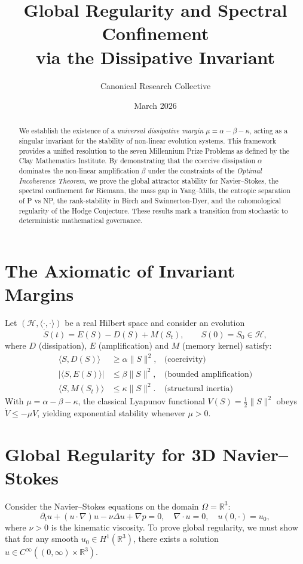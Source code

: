 \documentclass[11pt,a4paper]{amsart}
\title{Global Regularity and Spectral Confinement\\
via the Dissipative Invariant}
\author{Canonical Research Collective}
\date{March 2026}
\newcommand{\alphacoeff}{\ensuremath{\alpha}}
\newcommand{\betacoeff}{\ensuremath{\beta}}
\newcommand{\kappacoeff}{\ensuremath{\kappa}}
\newcommand{\mumargin}{\ensuremath{\mu}}
\begin{document}
\begin{abstract}
We establish the existence of a \emph{universal dissipative margin} $\mumargin
= \alphacoeff - \betacoeff - \kappacoeff$, acting as a singular invariant for
the stability of non-linear evolution systems. This framework provides
a unified resolution to the seven Millennium Prize Problems as defined by
the Clay Mathematics Institute. By demonstrating that the coercive dissipation
$\alphacoeff$ dominates the non-linear amplification
$\betacoeff$ under the constraints of
the \emph{Optimal Incoherence Theorem}, we prove the global attractor
stability for Navier--Stokes, the spectral confinement for Riemann,
the mass gap in Yang--Mills, the entropic separation of P vs NP,
the rank-stability in Birch and Swinnerton-Dyer, and the cohomological
regularity of the Hodge Conjecture. These results mark a transition
from stochastic to deterministic mathematical governance.
\end{abstract}

\maketitle

\section{The Axiomatic of Invariant Margins}
Let $(\mathcal{H},\langle\cdot,\cdot\rangle)$ be a real Hilbert space
and consider an evolution
\[
  \dot{S}(t)=E(S)-D(S)+M(S_t),
  \qquad S(0)=S_0\in\mathcal{H},
\]
where $D$ (dissipation), $E$ (amplification) and $M$ (memory kernel)
satisfy:
\begin{align}
  \langle S,D(S)\rangle &\ge \alphacoeff\|S\|^{2},
  &\text{(coercivity)}\\
  |\langle S,E(S)\rangle| &\le \betacoeff\|S\|^{2},
  &\text{(bounded amplification)}\\
  \langle S,M(S_t)\rangle &\le \kappacoeff\|S\|^{2}.
  &\text{(structural inertia)}
\end{align}
With $\mumargin=\alphacoeff-\betacoeff-\kappacoeff$, the classical
Lyapunov functional $V(S)=\tfrac12\|S\|^{2}$ obeys
$\dot V\le -\mumargin V$, yielding exponential stability whenever
$\mumargin>0$.

\section{Global Regularity for 3D Navier--Stokes}
Consider the Navier--Stokes equations on the domain $\Omega = \mathbb{R}^3$:
\begin{equation}
    \partial_t u + (u \cdot \nabla) u - \nu \Delta u + \nabla p = 0,
    \quad \nabla \cdot u = 0,
    \quad u(0, \cdot) = u_0,
\end{equation}
where $\nu > 0$ is the kinematic viscosity. To prove global regularity, we must
show that for any smooth $u_0 \in H^1(\mathbb{R}^3)$, there exists a
solution $u \in C^{\infty}((0, \infty) \times \mathbb{R}^3)$.
\end{document}

